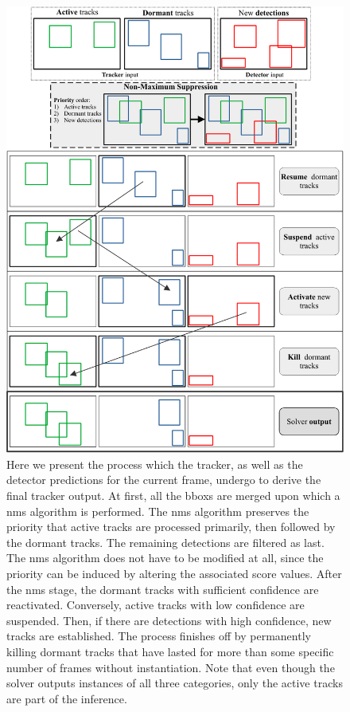 \begin{figure}[!t]
    \centering
    \includegraphics[width=0.85\linewidth]{figures/siamese_tracking/siammot_online_solver.pdf}
    \caption[\gls{siammot} online solver]{Here we present the process which the tracker, as well as the detector predictions for the current frame, undergo to derive the final tracker output. At first, all the \glspl{bbox} are merged upon which a \gls{nms} algorithm is performed. The \gls{nms} algorithm preserves the priority that active tracks are processed primarily, then followed by the dormant tracks. The remaining detections are filtered as last. The \gls{nms} algorithm does not have to be modified at all, since the priority can be induced by altering the associated score values. After the \gls{nms} stage, the dormant tracks with sufficient confidence are reactivated. Conversely, active tracks with low confidence are suspended. Then, if there are detections with high confidence, new tracks are established. The process finishes off by permanently killing dormant tracks that have lasted for more than some specific number of frames without instantiation. Note that even though the solver outputs instances of all three categories, only the active tracks are part of the inference.}
    \label{fig:SiamMOTOnlineSolver}
\end{figure}

